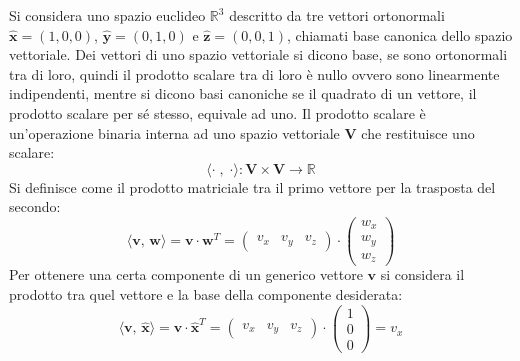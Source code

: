 \documentclass{article}
\newcommand{\vect}[1]{\boldsymbol{\mathbf{#1}}}
\numberwithin{equation}{subsection}
\begin{document}
Si considera uno spazio euclideo $\mathbb{R}^3$ descritto da tre vettori ortonormali $\hat{\vect{x}}=(1,0,0)$, $\hat{\vect{y}}=(0,1,0)$ e $\hat{\vect{z}}=(0,0,1)$, chiamati base canonica dello spazio vettoriale. 
Dei vettori di uno spazio vettoriale si dicono base, se sono ortonormali tra di loro, quindi il prodotto scalare tra di loro è nullo ovvero sono linearmente indipendenti, 
mentre si dicono basi canoniche se il quadrato di un vettore, il prodotto scalare per sé stesso, equivale ad uno. 
Il prodotto scalare è un'operazione binaria interna ad uno spazio vettoriale $\vect{V}$ che restituisce uno scalare:
\begin{equation*}
    \langle \cdot \; , \; \cdot \rangle : \vect{V} \times \vect{V}  \rightarrow \mathbb{R}
\end{equation*}
Si definisce come il prodotto matriciale tra il primo vettore per la trasposta del secondo:
\begin{equation*}
    \langle\vect{v},\,\vect{w}\rangle=\vect{v}\cdot \vect{w}^T=\begin{pmatrix}
        v_x &v_y&v_z
    \end{pmatrix}\cdot\begin{pmatrix}
        w_x\\ w_y \\ w_z
    \end{pmatrix}
\end{equation*} 
Per ottenere una certa componente di un generico vettore $\vect{v}$ si considera il prodotto tra quel vettore e la base della componente desiderata:
\begin{equation*}
    \langle\vect{v},\,\hat{\vect{x}}\rangle=\vect{v}\cdot \hat{\vect{x}}^T=\begin{pmatrix}
        v_x &v_y&v_z
    \end{pmatrix}\cdot\begin{pmatrix}
        1\\ 0 \\0
    \end{pmatrix}=v_x
\end{equation*} 
\end{document}
